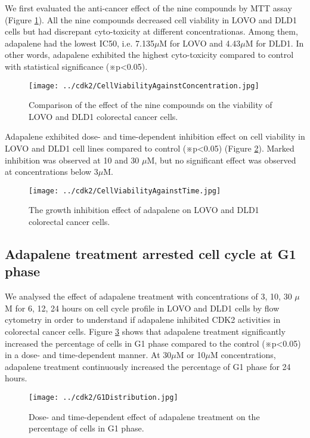We first evaluated the anti-cancer effect of the nine compounds by MTT assay (Figure \ref{cdk2:CellViabilityAgainstConcentration}). All the nine compounds decreased cell viability in LOVO and DLD1 cells but had discrepant cyto-toxicity at different concentrationas. Among them, adapalene had the lowest IC50, i.e. 7.135$\mu$M for LOVO and 4.43$\mu$M for DLD1. In other words, adapalene exhibited the highest cyto-toxicity compared to control with statistical significance (※p<0.05).

\begin{figure}
\centering
\texttt{[image: ../cdk2/CellViabilityAgainstConcentration.jpg]}
\caption{Comparison of the effect of the nine compounds on the viability of LOVO and DLD1 colorectal cancer cells.}
\label{cdk2:CellViabilityAgainstConcentration}
\end{figure}

Adapalene exhibited dose- and time-dependent inhibition effect on cell viability in LOVO and DLD1 cell lines compared to control (※p<0.05) (Figure \ref{cdk2:CellViabilityAgainstTime}). Marked inhibition was observed at 10 and 30 $\mu$M, but no significant effect was observed at concentrations below 3$\mu$M.

\begin{figure}
\centering
\texttt{[image: ../cdk2/CellViabilityAgainstTime.jpg]}
\caption{The growth inhibition effect of adapalene on LOVO and DLD1 colorectal cancer cells.}
\label{cdk2:CellViabilityAgainstTime}
\end{figure}

\subsection{Adapalene treatment arrested cell cycle at G1 phase}

We analysed the effect of adapalene treatment with concentrations of 3, 10, 30 $\mu$M for 6, 12, 24 hours on cell cycle profile in LOVO and DLD1 cells by flow cytometry in order to understand if adapalene inhibited CDK2 activities in colorectal cancer cells. Figure \ref{cdk2:G1Distribution} shows that adapalene treatment significantly increased the percentage of cells in G1 phase compared to the control (※p<0.05) in a dose- and time-dependent manner. At 30$\mu$M or 10$\mu$M concentrations, adapalene treatment continuously increased the percentage of G1 phase for 24 hours.

\begin{figure}
\centering
\texttt{[image: ../cdk2/G1Distribution.jpg]}
\caption{Dose- and time-dependent effect of adapalene treatment on the percentage of cells in G1 phase.}
\label{cdk2:G1Distribution}
\end{figure}

